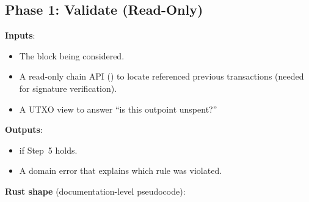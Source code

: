 \subsection{Phase 1: Validate (Read-Only)}
\label{sec:ch10-phase1-validate}

\textbf{Inputs}:

\begin{itemize}
  \item The block being considered.
  \item A read-only chain API () to locate referenced previous transactions (needed for signature verification).
  \item A UTXO view to answer ``is this outpoint unspent?''
\end{itemize}

\textbf{Outputs}:

\begin{itemize}
  \item {} if Step~5 holds.
  \item A domain error that explains which rule was violated.
\end{itemize}

\textbf{Rust shape} (documentation-level pseudocode):

